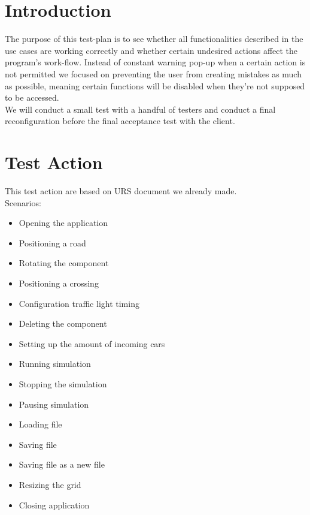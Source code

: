 \documentclass[a4paper,11pt]{article}
\title{\Title}
\author{}
\date{\today}
\begin{document}
\begin{titlepage}
\maketitle
\end{titlepage}
	\linespread{1.15}
	\tableofcontents
	\newpage
	\section{Introduction}
	The purpose of this test-plan is to see whether all functionalities described in the use cases are working correctly and whether certain undesired actions affect the program's work-flow. Instead of constant warning pop-up when a certain action is not permitted we focused on preventing the user from creating mistakes as much as possible, meaning certain functions will be disabled when they're not supposed to be accessed.\\
	We will conduct a small test with a handful of testers and conduct a final reconfiguration before the final acceptance test with the client.
	
	\section{Test Action}
	This test action are based on URS document we already made.\\
	
	Scenarios: 
	\begin{itemize}
		\item Opening the application
		\item Positioning a road
		\item Rotating the component
		\item Positioning a crossing
		\item Configuration traffic light timing
		\item Deleting the component
		\item Setting up the amount of incoming cars 
		\item Running simulation
		\item Stopping the simulation
		\item Pausing simulation
		\item Loading file
		\item Saving file
		\item Saving file as a new file
		\item Resizing the grid
		\item Closing application
	\end{itemize}
	
	\newpage
	
\end{document}
